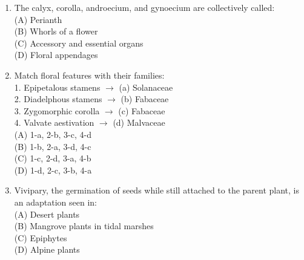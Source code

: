 \documentclass{article}
\begin{document}
\begin{enumerate}[label=Q\arabic*.]
\item The calyx, corolla, androecium, and gynoecium are collectively called:
\\(A) Perianth
\\(B) Whorls of a flower
\\(C) Accessory and essential organs
\\(D) Floral appendages

\item Match floral features with their families:\\
1. Epipetalous stamens $\rightarrow$ (a) Solanaceae\\
2. Diadelphous stamens $\rightarrow$ (b) Fabaceae\\
3. Zygomorphic corolla $\rightarrow$ (c) Fabaceae\\
4. Valvate aestivation $\rightarrow$ (d) Malvaceae
\\(A) 1-a, 2-b, 3-c, 4-d
\\(B) 1-b, 2-a, 3-d, 4-c
\\(C) 1-c, 2-d, 3-a, 4-b
\\(D) 1-d, 2-c, 3-b, 4-a

\item Vivipary, the germination of seeds while still attached to the parent plant, is an adaptation seen in:
\\(A) Desert plants
\\(B) Mangrove plants in tidal marshes
\\(C) Epiphytes
\\(D) Alpine plants

\end{enumerate}
\end{document}
